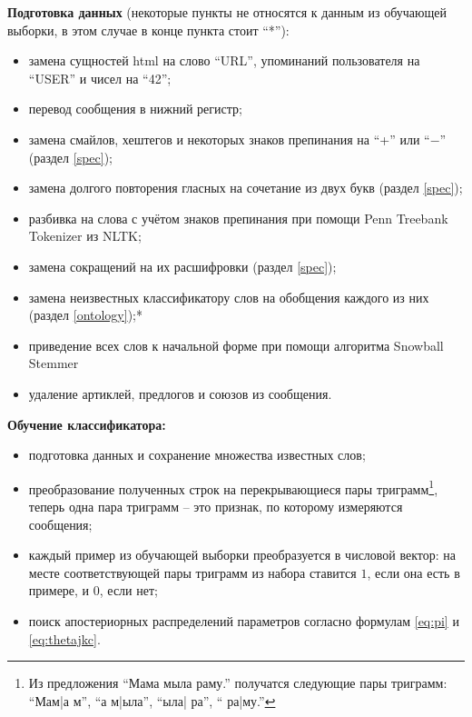 \textbf{Подготовка данных} (некоторые пункты не относятся к данным из обучающей выборки, в этом
случае в конце пункта стоит ``*''):
\begin{itemize}
  \setlength{\itemsep}{1pt}%
    \setlength{\parskip}{1pt}
  \item замена сущностей html на слово ``URL'', упоминаний пользователя на ``USER'' и чисел на ``42'';
  \item перевод сообщения в нижний регистр;
  \item замена смайлов, хештегов и некоторых знаков препинания на ``+'' или ``$\minus$'' (раздел \ref{spec});
  \item замена долгого повторения гласных на сочетание из двух букв (раздел \ref{spec});
  \item разбивка на слова с учётом знаков препинания при помощи Penn Treebank Tokenizer из NLTK\cite{bird2006nltk};
  \item замена сокращений на их расшифровки (раздел \ref{spec});
  \item замена неизвестных классификатору слов на обобщения каждого из них (раздел \ref{ontology});*
  \item приведение всех слов к начальной форме при помощи алгоритма Snowball
  Stemmer\cite{porter2001snowball}
  \item удаление артиклей, предлогов и союзов из сообщения.
\end{itemize}

\textbf{Обучение классификатора:}
\begin{itemize}
  \setlength{\itemsep}{1pt}%
    \setlength{\parskip}{1pt}
\item подготовка данных и сохранение множества известных слов;
\item преобразование полученных строк на перекрывающиеся пары триграмм\footnote{Из предложения
    ``Мама мыла раму.'' получатся следующие пары триграмм: ``Мам|а м'', ``а м|ыла'', ``ыла| ра'', ``
    ра|му.''}, теперь одна пара триграмм -- это признак, по которому измеряются сообщения;
\item каждый пример из обучающей выборки преобразуется в числовой вектор: на месте соответствующей
  пары триграмм из набора ставится $1$, если она есть в примере, и $0$, если нет;
\item поиск апостериорных распределений параметров согласно формулам \ref{eq:pi} и \ref{eq:thetajkc}.
\end{itemize}

